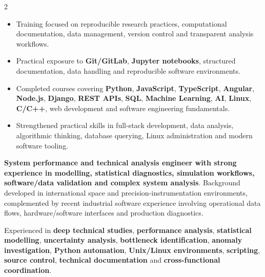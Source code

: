 \documentclass[8pt,a4paper,ragged2e,withhyper]{altacv}
\begin{document}
\begin{paracol}{2}


\divider


\begin{itemize}
\item Training focused on reproducible research practices, computational documentation, data management, version control and transparent analysis workflows.
\item Practical exposure to \textbf{Git/GitLab}, \textbf{Jupyter notebooks}, structured documentation, data handling and reproducible software environments.
\end{itemize}

\divider


\begin{itemize}
\item Completed courses covering \textbf{Python}, \textbf{JavaScript}, \textbf{TypeScript}, \textbf{Angular}, \textbf{Node.js}, \textbf{Django}, \textbf{REST APIs}, \textbf{SQL}, \textbf{Machine Learning}, \textbf{AI}, \textbf{Linux}, \textbf{C/C++}, web development and software engineering fundamentals.
\item Strengthened practical skills in full-stack development, data analysis, algorithmic thinking, database querying, Linux administration and modern software tooling.
\end{itemize}

\switchcolumn


\textbf{System performance and technical analysis engineer with strong experience in modelling, statistical diagnostics, simulation workflows, software/data validation and complex system analysis}. Background developed in international space and precision-instrumentation environments, complemented by recent industrial software experience involving operational data flows, hardware/software interfaces and production diagnostics.

Experienced in \textbf{deep technical studies}, \textbf{performance analysis}, \textbf{statistical modelling}, \textbf{uncertainty analysis}, \textbf{bottleneck identification}, \textbf{anomaly investigation}, \textbf{Python automation}, \textbf{Unix/Linux environments}, \textbf{scripting}, \textbf{source control}, \textbf{technical documentation} and \textbf{cross-functional coordination}.


\end{paracol}
\end{document}
